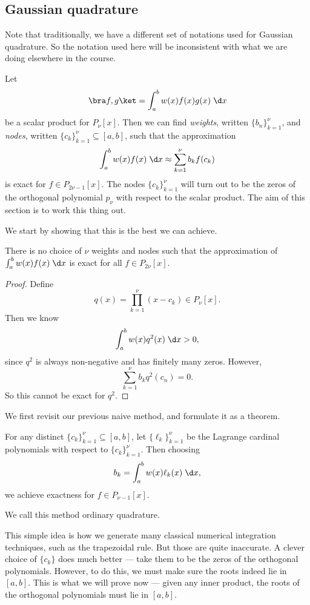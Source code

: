 \documentclass[a4paper]{article}
\begin{document}
\subsection{Gaussian quadrature}
Note that traditionally, we have a different set of notations used for Gaussian quadrature. So the notation used here will be inconsistent with what we are doing elsewhere in the course.

Let
\[
  \bra f, g\ket = \int_a^b w(x) f(x)g(x)\;\d x
\]
be a scalar product for $P_\nu[x]$. Then we can find \emph{weights}, written $\{b_n\}_{k = 1}^\nu$, and \emph{nodes}, written $\{c_k\}_{k = 1}^\nu \subseteq [a, b]$, such that the approximation
\[
  \int_a^b w(x) f(x)\;\d x \approx \sum_{k = 1}^{\nu} b_k f(c_k)
\]
is exact for $f \in P_{2\nu - 1}[x]$. The nodes $\{c_k\}_{k = 1}^{\nu}$ will turn out to be the zeros of the orthogonal polynomial $p_\nu$ with respect to the scalar product. The aim of this section is to work this thing out.

We start by showing that this is the best we can achieve.
\begin{prop}
  There is no choice of $\nu$ weights and nodes such that the approximation of $\int_a^b w(x) f(x)\;\d x$ is exact for all $f \in P_{2\nu}[x]$.
\end{prop}

\begin{proof}
  Define
  \[
    q(x) = \prod_{k = 1}^{\nu} (x - c_k) \in P_{\nu}[x].
  \]
  Then we know
  \[
    \int_a^b w(x) q^2(x)\;\d x > 0,
  \]
  since $q^2$ is always non-negative and has finitely many zeros. However,
  \[
    \sum_{k = 1}^\nu b_k q^2(c_n) = 0.
  \]
  So this cannot be exact for $q^2$.
\end{proof}

We first revisit our previous naive method, and formulate it as a theorem.
\begin{thm}
  For any distinct $\{c_k\}_{k = 1}^\nu \subseteq [a, b]$, let $\{\ell_k\}_{k = 1}^\nu$ be the Lagrange cardinal polynomials with respect to $\{c_k\}_{k = 1}^\nu$. Then choosing
  \[
    b_k = \int_a^b w(x) \ell_k(x) \;\d x,
  \]
  we achieve exactness for $f \in P_{\nu - 1}[x]$.

  We call this method ordinary quadrature.
\end{thm}
This simple idea is how we generate many classical numerical integration techniques, such as the trapezoidal rule. But those are quite inaccurate. A clever choice of $\{c_k\}$ does much better --- take them to be the zeros of the orthogonal polynomials. However, to do this, we must make sure the roots indeed lie in $[a, b]$. This is what we will prove now --- given any inner product, the roots of the orthogonal polynomials must lie in $[a, b]$.
\end{document}
